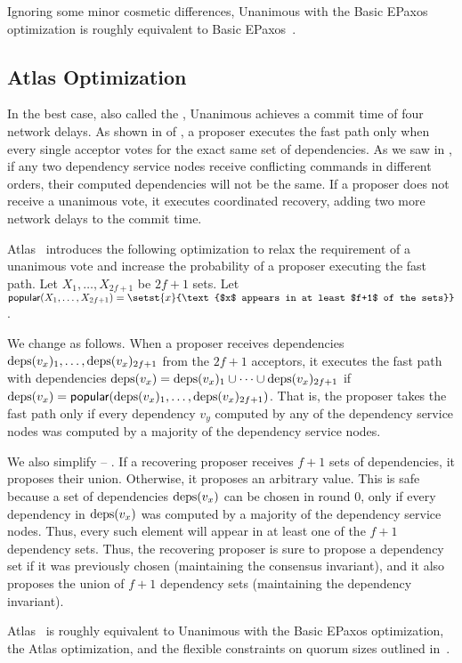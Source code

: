 Ignoring some minor cosmetic differences, Unanimous \BPaxos{} with the Basic
EPaxos optimization is roughly equivalent to Basic
EPaxos~\cite{moraru2013there}.

\subsection{Atlas Optimization}
In the best case, also called the , Unanimous \BPaxos{}
achieves a commit time of four network delays. As shown in
 of , a proposer
executes the fast path only when every single acceptor votes for the exact same
set of dependencies. As we saw in , if any two dependency
service nodes receive conflicting commands in different orders, their computed
dependencies will not be the same. If a proposer does not receive a unanimous
vote, it executes coordinated recovery, adding two more network delays to the
commit time.

\newcommand{\popular}[1]{\textsf{popular}(#1)}
Atlas~\cite{enes2020state} introduces the following optimization to relax the
requirement of a unanimous vote and increase the probability of a proposer
executing the fast path. Let $X_1, \ldots, X_{2f+1}$ be $2f+1$ sets. Let
$\popular{X_1, \ldots, X_{2f+1}} = \setst{x}{\text{$x$ appears in at least
$f+1$ of the sets}}$.

We change  as follows. When a proposer receives
dependencies $\text{deps}(v_x)_1, \ldots, \text{deps}(v_x)_{2f+1}$ from the $2f+1$
acceptors, it executes the fast path with dependencies $\text{deps}(v_x) =
\text{deps}(v_x)_1 \cup \cdots \cup \text{deps}(v_x)_{2f+1}$ if $\deps{v_x} =
\popular{\deps{v_x}_1, \ldots, \deps{v_x}_{2f+1}}$. That is, the proposer takes
the fast path only if every dependency $v_y$ computed by any of the dependency
service nodes was computed by a majority of the dependency service nodes.

We also simplify  -- . If a
recovering proposer receives $f+1$ sets of dependencies, it proposes their
union. Otherwise, it proposes an arbitrary value. This is safe because a set of
dependencies $\text{deps}(v_x)$ can be chosen in round $0$, only if every dependency
in $\text{deps}(v_x)$ was computed by a majority of the dependency service nodes.
Thus, every such element will appear in at least one of the $f+1$ dependency
sets. Thus, the recovering proposer is sure to propose a dependency set if it
was previously chosen (maintaining the consensus invariant), and it also
proposes the union of $f+1$ dependency sets (maintaining the dependency
invariant).

Atlas~\cite{enes2020state} is roughly equivalent to Unanimous \BPaxos{} with
the Basic EPaxos optimization, the Atlas optimization, and the flexible
constraints on quorum sizes outlined in~\cite{howard2021fast}.
